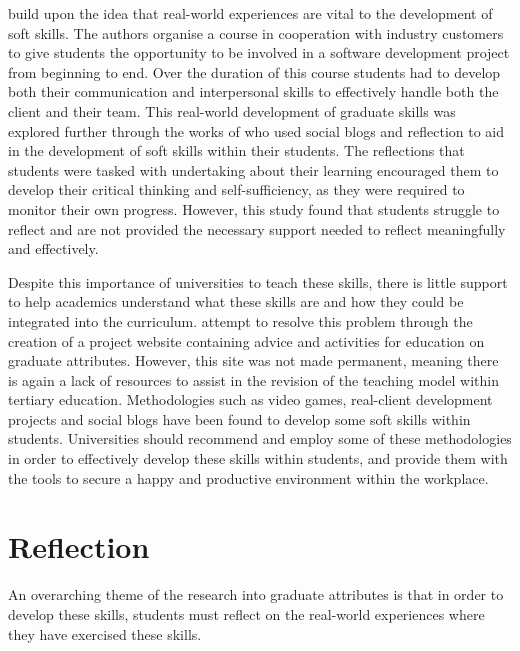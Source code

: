 \documentclass{l4proj}
\begin{document}
\citet{abernethy_teaching_2009} build upon the idea that real-world experiences are vital to the development of soft skills. The authors organise a course in cooperation with industry customers to give students the opportunity to be involved in a software development project from beginning to end. Over the duration of this course students had to develop both their communication and interpersonal skills to effectively handle both the client and their team. This real-world development of graduate skills was explored further through the works of \citet{mcdermott_developing_nodate} who used social blogs and reflection to aid in the development of soft skills within their students. The reflections that students were tasked with undertaking about their learning encouraged them to develop their 
critical thinking and self-sufficiency, as they were required to monitor their own progress. However, this study found that students struggle to reflect and are not provided the necessary support needed to reflect meaningfully and effectively. 

Despite this importance of universities to teach these skills, there is little support to help academics understand what these skills are and how they could be integrated into the curriculum. \citet{litchfield_contextualising_2010} attempt to resolve this problem through the creation of a project website containing advice and activities for education on graduate attributes. However, this site was not made permanent, meaning there is again a lack of resources to assist in the revision of the teaching model within tertiary education. Methodologies such as video games, real-client development projects and social blogs have been found to develop some soft skills within students. Universities should recommend and employ some of these methodologies in order to effectively develop these skills within students, and provide them with the tools to secure a happy and productive environment within the workplace.

\section{Reflection} \label{backgroundReflection}

An overarching theme of the research into graduate attributes is that in order to develop these skills, students must reflect on the real-world experiences where they have exercised these skills. 
\end{document}
